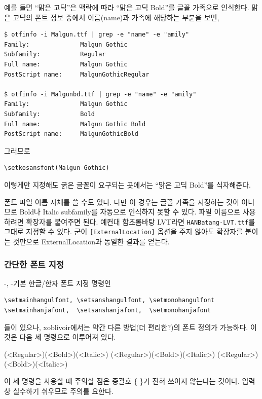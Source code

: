 \documentclass[
	12pt,
	a4paper,
	kosection,
	footnote,
	microtype,
	figtabcapt,
]{oblivoir}
\def\oblivoirdblquote#1{``#1''}
\newcommand\xobclass{x\-ob\-liv\-oir\oblivoirallowbreak}
\begin{document}
예를 들면
\oblivoirdblquote{맑은 고딕}은 맥락에 따라 \oblivoirdblquote{맑은 고딕 Bold}를
글꼴 가족으로 인식한다. 맑은 고딕의 폰트 정보 중에서 이름(name)과 가족에 해당하는 부분을 보면,
\begin{verbatim}
$ otfinfo -i Malgun.ttf | grep -e "name" -e "amily"
Family:              Malgun Gothic
Subfamily:           Regular
Full name:           Malgun Gothic
PostScript name:     MalgunGothicRegular

$ otfinfo -i Malgunbd.ttf | grep -e "name" -e "amily"
Family:              Malgun Gothic
Subfamily:           Bold
Full name:           Malgun Gothic Bold
PostScript name:     MalgunGothicBold
\end{verbatim}

그러므로
\begin{verbatim}
\setkosansfont(Malgun Gothic)
\end{verbatim}
이렇게만 지정해도 굵은 글꼴이 요구되는 곳에서는 \oblivoirdblquote{맑은 고딕 Bold}를
식자해준다.

폰트 파일 이름 자체를 쓸 수도 있다. 다만 이 경우는 글꼴 가족을 지정하는 것이 아니므로 Bold나 Italic subfamily를
자동으로 인식하지 못할 수 있다. 파일 이름으로 사용하려면 확장자를 붙여주면 된다. 예컨대 함초롬바탕 LVT라면
\texttt{HANBatang-LVT.ttf}를 그대로 지정할 수 있다. 굳이 \texttt{[ExternalLocation]} 옵션을 주지
않아도 확장자를 붙이는 것만으로 ExternalLocation과 동일한 결과를 얻는다.

\subsubsection{간단한 폰트 지정}

\XeTeX-\ko, \LuaTeX- 기본 한글/한자 폰트 지정 명령인
\begin{verbatim}
\setmainhangulfont, \setsanshangulfont, \setmonohangulfont
\setmainhanjafont,  \setsanshanjafont,  \setmonohanjafont
\end{verbatim}
들이 있으나, 
\xobclass 에서는 약간 다른 방법(더 편리한?)의 폰트 정의가
가능하다. 이것은 다음 세 명령으로 이루어져 있다.
\begin{boxedverbatim}
\setkomainfont[<basename>](<Regular>)(<Bold>)(<Italic>)
\setkosansfont[<basename>](<Regular>)(<Bold>)(<Italic>)
\setkomonofont[<basename>](<Regular>)(<Bold>)(<Italic>)
\end{boxedverbatim}

이 세 명령을 사용할 때 주의할 점은 중괄호 \{ \}가 전혀 쓰이지 않는다는 것이다.
입력상 실수하기 쉬우므로 주의를 요한다.
\end{document}
